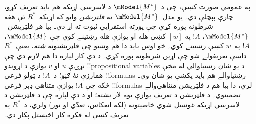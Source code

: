 \documentclass[../../../include/open-logic-section]{subfiles}
\begin{document}
په عمومي صورت کښې، چې د~$\mModel{M^*}$ د لاسرسي اړيکه هم بايد تعريف
کړو، چارې پېچلې دي۔ يو مدل~$\mModel{M^*}$ ته \emph{فلټريشن} وايو که
اړيکه~$R^*$ ئې هغه شرطونه پوره کړي چې پورته استقرايي ثبوت ته اړ دي۔
بيا هر فلټريشن~$\mModel{M^*}$، $!A$ په $[w]$ کښې هله او يوازې هله
رښتينے کوي چې $\mModel{M}$، $!A$ په~$w$ کښې رښتينے کوي۔ خو اوس بايد دا
هم وښيو چې فلټريشنونه \emph{شته}، يعنې~$R^*$ داسې تعريفولے شو چې اړين
شرطونه پوره کړي۔ د دې کار لپاره دا هم لازم دي چې نړۍې $u$ او $v$ يوازې
د اړوندو !!{propositional variable}s د يو شان رښتياوالي له مخې
همارزې نۀ ګڼو؛ د~$!A$ د ټولو فرعي !!{formula}s رښتياوالے هم بايد
پکښې يو شان وي۔ ځکه چې $!A$ يوازې متناهي ډېر فرعي !!{formula}s
لري، دا بيا هم د فلټريشن متناهي‌والے تضمينوي۔ د فلټريشن د تعريف يوازې
يوه لار نشته؛ او د دې لپاره چې د فلټريشن د لاسرسي اړيکه غوښتل شوي
خاصيتونه (لکه انعکاس، تعدّي او نور) ولري، د~$R^*$ په تعريف کښې
له فکره کار اخيستل پکار دي۔
\end{document}
